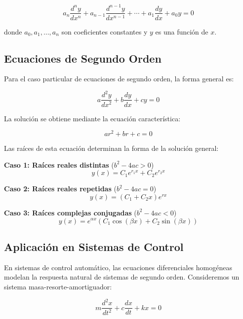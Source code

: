 \documentclass[12pt]{article}
\begin{document}
\begin{equation}
    a_n \frac{d^n y}{dx^n} + a_{n-1} \frac{d^{n-1} y}{dx^{n-1}} + \cdots + a_1 \frac{dy}{dx} + a_0 y = 0
\end{equation}

donde $a_0, a_1, \ldots, a_n$ son coeficientes constantes y $y$ es una función de $x$.

\subsection{Ecuaciones de Segundo Orden}

Para el caso particular de ecuaciones de segundo orden, la forma general es:

\begin{equation}
    a \frac{d^2 y}{dx^2} + b \frac{dy}{dx} + c y = 0
\end{equation}

La solución se obtiene mediante la ecuación característica:

\begin{equation}
    ar^2 + br + c = 0
\end{equation}

Las raíces de esta ecuación determinan la forma de la solución general:

\textbf{Caso 1: Raíces reales distintas} ($b^2 - 4ac > 0$)
\begin{equation}
    y(x) = C_1 e^{r_1 x} + C_2 e^{r_2 x}
\end{equation}

\textbf{Caso 2: Raíces reales repetidas} ($b^2 - 4ac = 0$)
\begin{equation}
    y(x) = (C_1 + C_2 x) e^{rx}
\end{equation}

\textbf{Caso 3: Raíces complejas conjugadas} ($b^2 - 4ac < 0$)
\begin{equation}
    y(x) = e^{\alpha x} (C_1 \cos(\beta x) + C_2 \sin(\beta x))
\end{equation}

\subsection{Aplicación en Sistemas de Control}

En sistemas de control automático, las ecuaciones diferenciales homogéneas modelan la respuesta natural de sistemas de segundo orden. Consideremos un sistema masa-resorte-amortiguador:

\begin{equation}
    m \frac{d^2 x}{dt^2} + c \frac{dx}{dt} + kx = 0
\end{equation}
\end{document}
